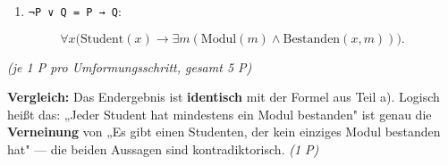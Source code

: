 \documentclass[11pt, a4paper]{article}
\begin{document}
\begin{enumerate}
  \item \texttt{¬P ∨ Q = P → Q}:
\end{enumerate}
\[
\forall x \big(\text{Student}(x) \to \exists m (\text{Modul}(m) \land \text{Bestanden}(x, m))\big).
\]


\textit{(je 1 P pro Umformungsschritt, gesamt 5 P)}


\textbf{Vergleich:} Das Endergebnis ist \textbf{identisch} mit der Formel aus Teil a). Logisch heißt das: „Jeder Student hat mindestens ein Modul bestanden" ist genau die \textbf{Verneinung} von „Es gibt einen Studenten, der kein einziges Modul bestanden hat" — die beiden Aussagen sind kontradiktorisch. \textit{(1 P)}





\end{document}
